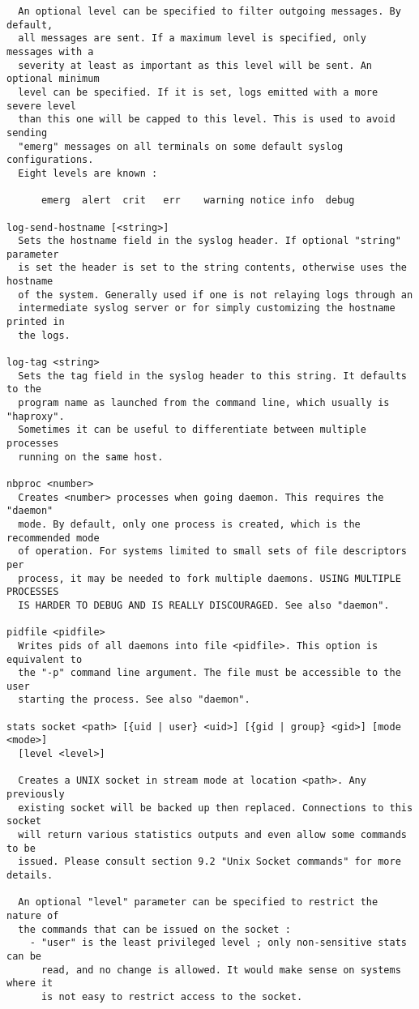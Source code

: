 \begin{verbatim}
  An optional level can be specified to filter outgoing messages. By default,
  all messages are sent. If a maximum level is specified, only messages with a
  severity at least as important as this level will be sent. An optional minimum
  level can be specified. If it is set, logs emitted with a more severe level
  than this one will be capped to this level. This is used to avoid sending
  "emerg" messages on all terminals on some default syslog configurations.
  Eight levels are known :

	  emerg  alert  crit   err    warning notice info  debug

log-send-hostname [<string>]
  Sets the hostname field in the syslog header. If optional "string" parameter
  is set the header is set to the string contents, otherwise uses the hostname
  of the system. Generally used if one is not relaying logs through an
  intermediate syslog server or for simply customizing the hostname printed in
  the logs.

log-tag <string>
  Sets the tag field in the syslog header to this string. It defaults to the
  program name as launched from the command line, which usually is "haproxy".
  Sometimes it can be useful to differentiate between multiple processes
  running on the same host.

nbproc <number>
  Creates <number> processes when going daemon. This requires the "daemon"
  mode. By default, only one process is created, which is the recommended mode
  of operation. For systems limited to small sets of file descriptors per
  process, it may be needed to fork multiple daemons. USING MULTIPLE PROCESSES
  IS HARDER TO DEBUG AND IS REALLY DISCOURAGED. See also "daemon".

pidfile <pidfile>
  Writes pids of all daemons into file <pidfile>. This option is equivalent to
  the "-p" command line argument. The file must be accessible to the user
  starting the process. See also "daemon".

stats socket <path> [{uid | user} <uid>] [{gid | group} <gid>] [mode <mode>]
  [level <level>]

  Creates a UNIX socket in stream mode at location <path>. Any previously
  existing socket will be backed up then replaced. Connections to this socket
  will return various statistics outputs and even allow some commands to be
  issued. Please consult section 9.2 "Unix Socket commands" for more details.

  An optional "level" parameter can be specified to restrict the nature of
  the commands that can be issued on the socket :
    - "user" is the least privileged level ; only non-sensitive stats can be
      read, and no change is allowed. It would make sense on systems where it
      is not easy to restrict access to the socket.


\end{verbatim}
